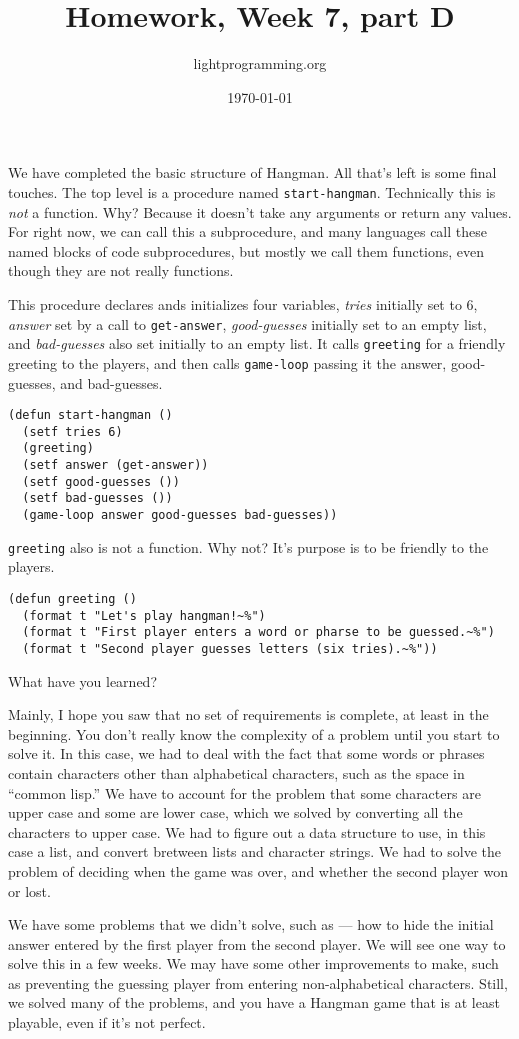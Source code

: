 \documentclass{article}
\title{Homework, Week 7, part D}
\author{lightprogramming.org}
\date{\today}
\begin{document}
\maketitle{}
\lstset{language=Lisp,numbers=left,keepspaces=false,basicstyle=\small,numberstyle=\tiny,breaklines=true,showstringspaces=false}

We have completed the basic structure of Hangman. All that's left is some final touches. The top level is a procedure named \texttt{start-hangman}. Technically this is \textit{not} a function. Why? Because it doesn't take any arguments or return any values. For right now, we can call this a subprocedure, and many languages call these named blocks of code subprocedures, but mostly we call them functions, even though they are not really functions. 

This procedure declares ands initializes four variables, \textit{tries} initially set to 6,  \textit{answer} set by a call to \texttt{get-answer}, \textit{good-guesses} initially set to an empty list, and \textit{bad-guesses} also set initially to an empty list. It calls \texttt{greeting} for a friendly greeting to the players, and then  calls \texttt{game-loop} passing it the answer, good-guesses, and bad-guesses.

\begin{lstlisting}
(defun start-hangman ()
  (setf tries 6)
  (greeting)
  (setf answer (get-answer))
  (setf good-guesses ())
  (setf bad-guesses ())
  (game-loop answer good-guesses bad-guesses))
\end{lstlisting}

\texttt{greeting} also is not a function. Why not? It's purpose is to be friendly to the players.

\begin{lstlisting}
(defun greeting ()
  (format t "Let's play hangman!~%")
  (format t "First player enters a word or pharse to be guessed.~%")
  (format t "Second player guesses letters (six tries).~%"))
\end{lstlisting}

What have you learned?

Mainly, I hope you saw that no set of requirements is complete, at least in the beginning. You don't really know the complexity of a problem until you start to solve it. In this case, we had to deal with the fact that some words or phrases contain characters other than alphabetical characters, such as the space in ``common lisp.'' We have to account for the problem that some characters are upper case and some are lower case, which we solved by converting all the characters to upper case. We had to figure out a data structure to use, in this case a list, and convert bretween lists and character strings. We had to solve the problem of deciding when the game was over, and whether the second player won or lost.

We have some problems that we didn't solve, such as --- how to hide the initial answer entered by the first player from the second player. We will see one way to solve this in a few weeks. We may have some other improvements to make, such as preventing the guessing player from entering non-alphabetical characters. Still, we solved many of the problems, and you have a Hangman game that is at least playable, even if it's not perfect. 
\end{document}
